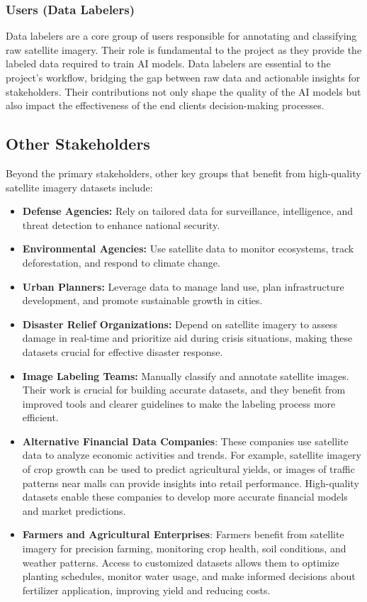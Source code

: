 \documentclass{article}
\begin{document}
\subsubsection{Users (Data Labelers)}
Data labelers are a core group of users responsible for annotating and classifying raw satellite imagery. Their role is fundamental to the project as they provide the labeled data required to train AI models. Data labelers are essential to the project's workflow, bridging the gap between raw data and actionable insights for stakeholders. Their contributions not only shape the quality of the AI models but also impact the effectiveness of the end clients decision-making processes.


\subsection{Other Stakeholders}
Beyond the primary stakeholders, other key groups that benefit from high-quality satellite imagery datasets include:
\begin{itemize}
    \item \textbf{Defense Agencies:} Rely on tailored data for surveillance, intelligence, and threat detection to enhance national security.
    \item \textbf{Environmental Agencies:} Use satellite data to monitor ecosystems, track deforestation, and respond to climate change.
    \item \textbf{Urban Planners:} Leverage data to manage land use, plan infrastructure development, and promote sustainable growth in cities.
    \item \textbf{Disaster Relief Organizations:} Depend on satellite imagery to assess damage in real-time and prioritize aid during crisis situations, making these datasets crucial for effective disaster response.
    \item \textbf{Image Labeling Teams:} Manually classify and annotate satellite images. Their work is crucial for building accurate datasets, and they benefit from improved tools and clearer guidelines to make the labeling process more efficient.
    \item \textbf{Alternative Financial Data Companies}: These companies use satellite data to analyze economic activities and trends. For example, satellite imagery of crop growth can be used to predict agricultural yields, or images of traffic patterns near malls can provide insights into retail performance. High-quality datasets enable these companies to develop more accurate financial models and market predictions.
    \item \textbf{Farmers and Agricultural Enterprises}: Farmers benefit from satellite imagery for precision farming, monitoring crop health, soil conditions, and weather patterns. Access to customized datasets allows them to optimize planting schedules, monitor water usage, and make informed decisions about fertilizer application, improving yield and reducing costs.
\end{itemize}
\end{document}
